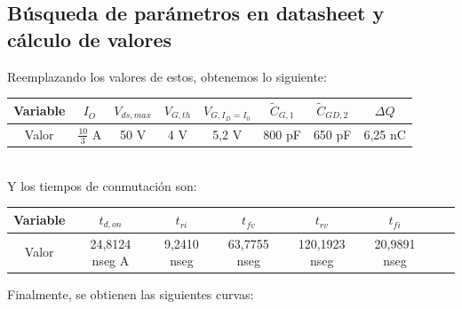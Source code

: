 \documentclass[e4_tp1_main.tex]{subfiles}
\begin{document}
\subsection{Búsqueda de parámetros en datasheet y cálculo de valores}

Reemplazando los valores de estos, obtenemos lo siguiente:\\
\begin{tabular}{|c|c|c|c|c|c|c|c|}
\hline
Variable & $I_O$ & $V_{ds,max}$ & $V_{G,th}$ & $V_{G,I_D=I_0}$ & $\tilde{C}_{G,1}$ & $\tilde{C}_{GD,2}$ & $\Delta Q$  \\
\hline
Valor & $\frac{10}{3}$ A & 50 V & 4 V & 5,2 V & 800 pF & 650 pF & 6,25 nC\\
\hline
\end{tabular}\\
Y los tiempos de conmutación son:\\
\begin{tabular}{|c|c|c|c|c|c|c|c|}
\hline
Variable & $t_{d,on}$ & $t_{ri}$ & $t_{fv}$ & $t_{rv}$ & $t_{fi}$  \\
\hline
Valor & 24,8124 nseg A & 9,2410 nseg & 63,7755 nseg & 120,1923 nseg & 20,9891 nseg\\
\hline
\end{tabular}

Finalmente, se obtienen las siguientes curvas:
\end{document}
